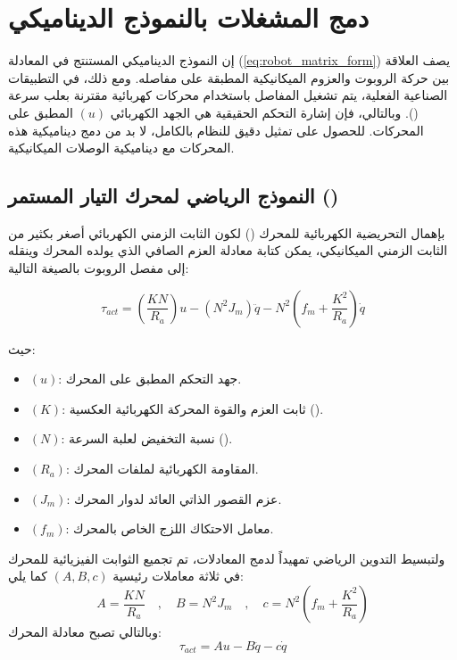 \section{دمج المشغلات بالنموذج الديناميكي}
\label{sec:actuator_dynamics}

إن النموذج الديناميكي المستنتج في المعادلة (\ref{eq:robot_matrix_form}) يصف العلاقة بين حركة الروبوت والعزوم الميكانيكية المطبقة على مفاصله. ومع ذلك، في التطبيقات الصناعية الفعلية، يتم تشغيل المفاصل باستخدام محركات كهربائية مقترنة بعلب سرعة (). وبالتالي، فإن إشارة التحكم الحقيقية هي الجهد الكهربائي $(u)$ المطبق على المحركات. للحصول على تمثيل دقيق للنظام بالكامل، لا بد من دمج ديناميكية هذه المحركات مع ديناميكية الوصلات الميكانيكية.

\subsection{النموذج الرياضي لمحرك التيار المستمر ()}
بإهمال التحريضية الكهربائية للمحرك () لكون الثابت الزمني الكهربائي أصغر بكثير من الثابت الزمني الميكانيكي، يمكن كتابة معادلة العزم الصافي الذي يولده المحرك وينقله إلى مفصل الروبوت بالصيغة التالية:

\begin{equation}
\tau_{act} = \left(\frac{K N}{R_a}\right) u - \left(N^2 J_m\right) \ddot{q} - N^2 \left(f_m + \frac{K^2}{R_a}\right) \dot{q}
\label{eq:motor_torque}
\end{equation}

حيث:
\begin{itemize}
    \item $(u)$: جهد التحكم المطبق على المحرك.
    \item $(K)$: ثابت العزم والقوة المحركة الكهربائية العكسية ().
    \item $(N)$: نسبة التخفيض لعلبة السرعة ().
    \item $(R_a)$: المقاومة الكهربائية لملفات المحرك.
    \item $(J_m)$: عزم القصور الذاتي العائد لدوار المحرك.
    \item $(f_m)$: معامل الاحتكاك اللزج الخاص بالمحرك.
\end{itemize}

ولتبسيط التدوين الرياضي تمهيداً لدمج المعادلات، تم تجميع الثوابت الفيزيائية للمحرك في ثلاثة معاملات رئيسية $(A, B, c)$ كما يلي:
\begin{equation}
A = \frac{K N}{R_a} \quad , \quad B = N^2 J_m \quad , \quad c = N^2 \left(f_m + \frac{K^2}{R_a}\right)
\end{equation}
وبالتالي تصبح معادلة المحرك:
\begin{equation}
\tau_{act} = A u - B \ddot{q} - c \dot{q}
\label{eq:motor_simplified}
\end{equation}

